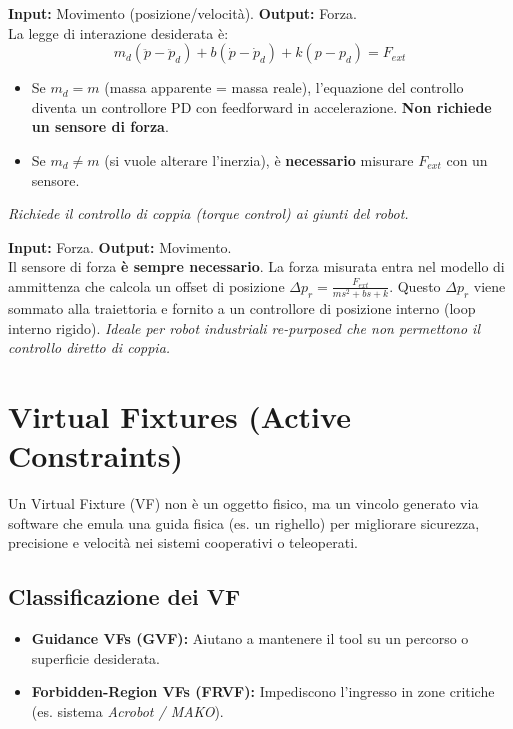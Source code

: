 \documentclass[11pt,a4paper,twoside]{report}
\begin{document}
\begin{mathbox}
    \textbf{Input:} Movimento (posizione/velocità). \textbf{Output:} Forza.\\
    La legge di interazione desiderata è:
    \begin{equation}
        m_d(\ddot{p} - \ddot{p}_d) + b(\dot{p} - \dot{p}_d) + k(p - p_d) = F_{ext}
    \end{equation}
    \begin{itemize}
        \item Se $m_d = m$ (massa apparente = massa reale), l'equazione del controllo diventa un controllore PD con feedforward in accelerazione. \textbf{Non richiede un sensore di forza}.
        \item Se $m_d \neq m$ (si vuole alterare l'inerzia), è \textbf{necessario} misurare $F_{ext}$ con un sensore.
    \end{itemize}
    \textit{Richiede il controllo di coppia (torque control) ai giunti del robot.}
\end{mathbox}

\begin{mathbox}
    \textbf{Input:} Forza. \textbf{Output:} Movimento.\\
    Il sensore di forza \textbf{è sempre necessario}. La forza misurata entra nel modello di ammittenza che calcola un offset di posizione $\Delta p_r = \frac{F_{ext}}{ms^2+bs+k}$. Questo $\Delta p_r$ viene sommato alla traiettoria e fornito a un controllore di posizione interno (loop interno rigido).
    \textit{Ideale per robot industriali re-purposed che non permettono il controllo diretto di coppia.}
\end{mathbox}


\chapter{Virtual Fixtures (Active Constraints)}
Un Virtual Fixture (VF) non è un oggetto fisico, ma un vincolo generato via software che emula una guida fisica (es. un righello) per migliorare sicurezza, precisione e velocità nei sistemi cooperativi o teleoperati.

\section{Classificazione dei VF}
\begin{itemize}
    \item \textbf{Guidance VFs (GVF):} Aiutano a mantenere il tool su un percorso o superficie desiderata.
    \item \textbf{Forbidden-Region VFs (FRVF):} Impediscono l'ingresso in zone critiche (es. sistema \textit{Acrobot / MAKO}).
\end{itemize}
\end{document}
